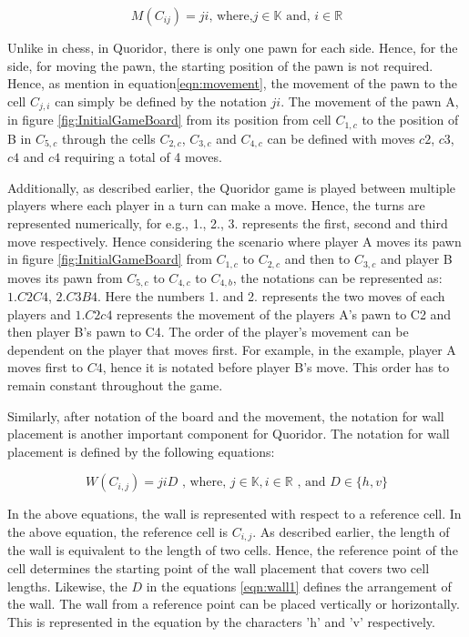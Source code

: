 \begin{equation}\label{eqn:movement}
M(C_{ij}) = ji \text{, where,} j \in \mathbb{K} \text{ and, } i \in \mathbb{R}     
\end{equation}

Unlike in chess, in Quoridor, there is only one pawn for each side. Hence, for the side, for moving the pawn, the starting position of the pawn is not required. Hence, as mention in equation\eqref{eqn:movement}, the movement of the pawn to the cell $C_{j, i}$ can simply be defined by the notation $ji$. The movement of the pawn A, in figure \ref{fig:InitialGameBoard} from its position from cell $C_{1, c}$ to the position of B in $C_{5,c}$ through the cells $C_{2, c}$, $C_{3, c}$ and $C_{4, c}$ can be defined with moves $c2$, $c3$, $c4$ and $c4$ requiring a total of 4 moves.

Additionally, as described earlier, the Quoridor game is played between multiple players where each player in a turn can make a move. Hence, the turns are represented numerically, for e.g., 1., 2., 3. represents the first, second and third move respectively. Hence considering the scenario where player A moves its pawn in figure \ref{fig:InitialGameBoard} from $C_{1,c}$ to $C_{2,c}$ and then to $C_{3,c}$ and player B moves its pawn from $C_{5,c}$ to $C_{4,c}$ to $C_{4,b}$, the notations can be represented as: $1. C2 C4$, $2. C3 B4$. Here the numbers 1. and 2. represents the two moves of each players and $1. C2 c4$ represents the movement of the players A's pawn to C2 and then player B's pawn to C4. The order of the player's movement can be dependent on the player that moves first. For example, in the example, player A moves first to $C4$, hence it is notated before player B's move. This order has to remain constant throughout the game.

Similarly, after notation of the board and the movement, the notation for wall placement is another important component for Quoridor. The notation for wall placement is defined by the following equations:

\begin{equation}\label{eqn:wall1}
W(C_{i,j}) = jiD \text{ , where, } j \in \mathbb{K}, i \in \mathbb{R}  \text{ , and } D \in \{h, v\}
\end{equation}

In the above equations, the wall is represented with respect to a reference cell. In the above equation, the reference cell is $C_{i, j}$. As described earlier, the length of the wall is equivalent to the length of two cells. Hence, the reference point of the cell determines the starting point of the wall placement that covers two cell lengths. Likewise, the $D$ in the equations \eqref{eqn:wall1} defines the arrangement of the wall. The wall from a reference point can be placed vertically or horizontally. This is represented in the equation by the characters 'h' and 'v' respectively.

